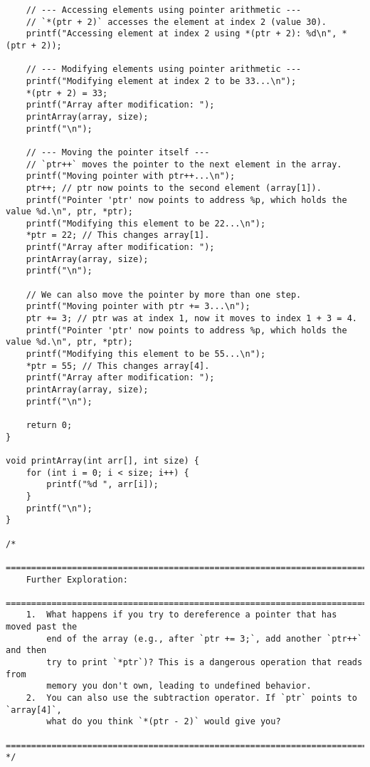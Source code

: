\documentclass[11pt]{book}
\begin{document}
\begin{verbatim}
    // --- Accessing elements using pointer arithmetic ---
    // `*(ptr + 2)` accesses the element at index 2 (value 30).
    printf("Accessing element at index 2 using *(ptr + 2): %d\n", *(ptr + 2));

    // --- Modifying elements using pointer arithmetic ---
    printf("Modifying element at index 2 to be 33...\n");
    *(ptr + 2) = 33;
    printf("Array after modification: ");
    printArray(array, size);
    printf("\n");

    // --- Moving the pointer itself ---
    // `ptr++` moves the pointer to the next element in the array.
    printf("Moving pointer with ptr++...\n");
    ptr++; // ptr now points to the second element (array[1]).
    printf("Pointer 'ptr' now points to address %p, which holds the value %d.\n", ptr, *ptr);
    printf("Modifying this element to be 22...\n");
    *ptr = 22; // This changes array[1].
    printf("Array after modification: ");
    printArray(array, size);
    printf("\n");

    // We can also move the pointer by more than one step.
    printf("Moving pointer with ptr += 3...\n");
    ptr += 3; // ptr was at index 1, now it moves to index 1 + 3 = 4.
    printf("Pointer 'ptr' now points to address %p, which holds the value %d.\n", ptr, *ptr);
    printf("Modifying this element to be 55...\n");
    *ptr = 55; // This changes array[4].
    printf("Array after modification: ");
    printArray(array, size);
    printf("\n");

    return 0;
}

void printArray(int arr[], int size) {
    for (int i = 0; i < size; i++) {
        printf("%d ", arr[i]);
    }
    printf("\n");
}

/*
    ================================================================================
    Further Exploration:
    ================================================================================
    1.  What happens if you try to dereference a pointer that has moved past the
        end of the array (e.g., after `ptr += 3;`, add another `ptr++` and then
        try to print `*ptr`)? This is a dangerous operation that reads from
        memory you don't own, leading to undefined behavior.
    2.  You can also use the subtraction operator. If `ptr` points to `array[4]`,
        what do you think `*(ptr - 2)` would give you?
    ================================================================================
*/

\end{verbatim}
\clearpage
\end{document}
